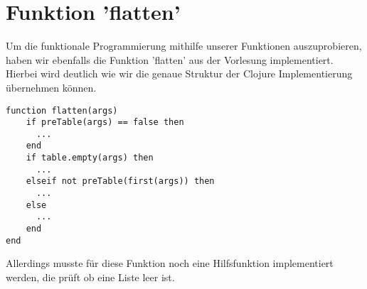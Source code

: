 \section{Funktion 'flatten'}{
Um die funktionale Programmierung mithilfe unserer Funktionen auszuprobieren, haben wir ebenfalls die Funktion 'flatten' aus der Vorlesung implementiert. Hierbei wird deutlich wie wir die genaue Struktur der Clojure Implementierung übernehmen können.

\begin{lstlisting}
function flatten(args)
    if preTable(args) == false then
      ...
    end
    if table.empty(args) then
      ...
    elseif not preTable(first(args)) then
      ...
    else
      ...
    end
end
\end{lstlisting} 

Allerdings musste für diese Funktion noch eine Hilfsfunktion implementiert werden, die prüft ob eine Liste leer ist.
}



